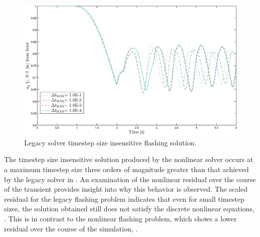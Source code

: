 \begin{figure}[h!t]
\centering
\includegraphics[width=.94\textwidth]{images/cobra_flashing_1em1_1em4.eps}
\caption{Legacy solver timestep size insensitive flashing solution.}
\label{fig:cobra_flashing_compare}
\end{figure}

The timestep size insensitive solution produced by the nonlinear solver occurs at a maximum timestep size three orders of magnitude greater than that achieved by the legacy solver in \cobra{}.
An examination of the nonlinear residual over the course of the transient provides insight into why this behavior is observed.
The scaled residual for the legacy flashing problem indicates that even for small timestep sizes, the solution obtained still does not satisfy the discrete nonlinear equations, .
This is in contrast to the nonlinear flashing problem, which shows a lower residual over the course of the simulation, .



